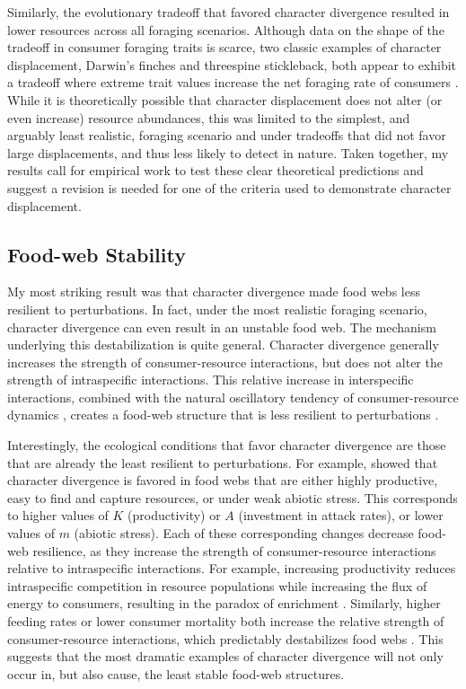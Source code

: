 \documentclass[11pt,]{article}
\begin{document}
Similarly, the evolutionary tradeoff that favored character divergence
resulted in lower resources across all foraging scenarios. Although data
on the shape of the tradeoff in consumer foraging traits is scarce, two
classic examples of character displacement, Darwin's finches and
threespine stickleback, both appear to exhibit a tradeoff where extreme
trait values increase the net foraging rate of consumers
\citep{Schluter1985, Arnegard2014}. While it is theoretically possible
that character displacement does not alter (or even increase) resource
abundances, this was limited to the simplest, and arguably least
realistic, foraging scenario and under tradeoffs that did not favor
large displacements, and thus less likely to detect in nature. Taken
together, my results call for empirical work to test these clear
theoretical predictions and suggest a revision is needed for one of the
criteria used to demonstrate character displacement.

\subsection{Food-web Stability}\label{food-web-stability}

My most striking result was that character divergence made food webs
less resilient to perturbations. In fact, under the most realistic
foraging scenario, character divergence can even result in an unstable
food web. The mechanism underlying this destabilization is quite
general. Character divergence generally increases the strength of
consumer-resource interactions, but does not alter the strength of
intraspecific interactions. This relative increase in interspecific
interactions, combined with the natural oscillatory tendency of
consumer-resource dynamics \citep{Lotka1925, Volterra1926}, creates a
food-web structure that is less resilient to perturbations
\citep{Chesson2008, Rip2011, McCann2011}.

Interestingly, the ecological conditions that favor character divergence
are those that are already the least resilient to perturbations. For
example, \citet{McPeek2019} showed that character divergence is favored
in food webs that are either highly productive, easy to find and capture
resources, or under weak abiotic stress. This corresponds to higher
values of \(K\) (productivity) or \(A\) (investment in attack rates), or
lower values of \(m\) (abiotic stress). Each of these corresponding
changes decrease food-web resilience, as they increase the strength of
consumer-resource interactions relative to intraspecific interactions.
For example, increasing productivity reduces intraspecific competition
in resource populations while increasing the flux of energy to
consumers, resulting in the paradox of enrichment
\citep{Rosenzweig1971}. Similarly, higher feeding rates or lower
consumer mortality both increase the relative strength of
consumer-resource interactions, which predictably destabilizes food webs
\citep{Rip2011, McCann2011}. This suggests that the most dramatic
examples of character divergence will not only occur in, but also cause,
the least stable food-web structures.
\end{document}
